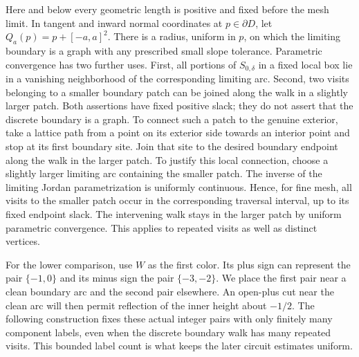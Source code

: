 Here and below every geometric length is positive and fixed before the
mesh limit.  In tangent and inward normal coordinates at
$p\in\partial D$, let $Q_a(p)=p+[-a,a]^2$.  There is a radius, uniform in
$p$, on which the limiting boundary is a graph with any prescribed
small slope tolerance.  Parametric convergence has two further uses.
First, all portions of $S_{0,\delta}$ in a fixed local box lie in a
vanishing neighborhood of the corresponding limiting arc.  Second,
two visits belonging to a smaller boundary patch can be joined along
the walk in a slightly larger patch.  Both assertions have fixed
positive slack; they do not assert that the discrete boundary is a
graph.  To connect such a patch to the genuine exterior, take a lattice
path from a point on its exterior side towards an interior point and
stop at its first boundary site.  Join that site to the desired
boundary endpoint along the walk in the larger patch.  To justify this
local connection, choose a slightly larger limiting arc containing the
smaller patch.  The inverse of the limiting Jordan
parametrization is uniformly continuous.  Hence, for fine mesh, all
visits to the smaller patch occur in the corresponding traversal
interval, up to its fixed endpoint slack.  The intervening walk stays
in the larger patch by uniform parametric convergence.  This applies
to repeated visits as well as distinct vertices.

For the lower comparison, use $W$ as the first color.  Its plus sign
can represent the pair $\{-1,0\}$ and its minus sign the pair
$\{-3,-2\}$.  We place the first pair near a clean boundary arc and
the second pair elsewhere.  An open-plus cut near the clean arc will
then permit reflection of the inner height about $-1/2$.  The following
construction fixes these actual integer pairs with only finitely many
component labels, even when the discrete boundary walk has many repeated
visits.  This bounded label count is what keeps the later circuit
estimates uniform.

